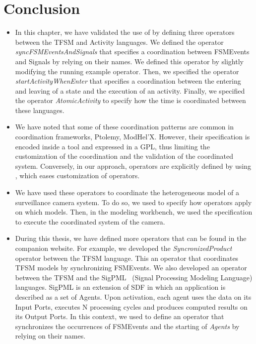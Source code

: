 \section{Conclusion}

\begin{itemize}
	\item In this chapter, we have validated the use of \bcool by defining three operators between the TFSM and Activity languages. We defined the operator \emph{syncFSMEventsAndSignals} that specifies a coordination between FSMEvents and Signals by relying on their names. We defined this operator by slightly modifying the running example operator. Then, we specified the operator \emph{startActivityWhenEnter} that specifies a coordination between the entering and leaving of a state and the execution of an activity. Finally, we specified the operator \emph{AtomicActivity} to specify how the time is coordinated between these languages.
	
	
	\item We have noted that some of these coordination patterns are common in coordination frameworks, \eg Ptolemy, ModHel'X. However, their specification is encoded inside a tool and expressed in a GPL, thus limiting the customization of the coordination and the validation of the coordinated system. Conversely, in our approach, operators are explicitly defined by using \bcool, which eases customization of operators.
	
	
	\item We have used these operators to coordinate the heterogeneous model of a surveillance camera system. To do so, we used \bflow to specify how operators apply on which models. Then, in the modeling workbench, we used the \bflow specification to execute the coordinated system of the camera.  
	
	
	\item During this thesis, we have defined more operators that can be found in the companion website. For example, we developed the \emph{SyncronizedProduct} operator between the TFSM language. This an operator that coordinates TFSM models by synchronizing FSMEvents. We also developed an operator between the TFSM and the SigPML~\cite{moccmlbib} (Signal Processing Modeling Language) languages. SigPML is an extension of SDF in which an application is described as a set of Agents. Upon activation, each agent uses the data on its Input Ports, executes N processing cycles and produces computed results on its Output Ports. In this context, we used \bcool to define an operator that synchronizes the occurrences of FSMEvents and the starting of \emph{Agents} by relying on their names. 


\end{itemize}
